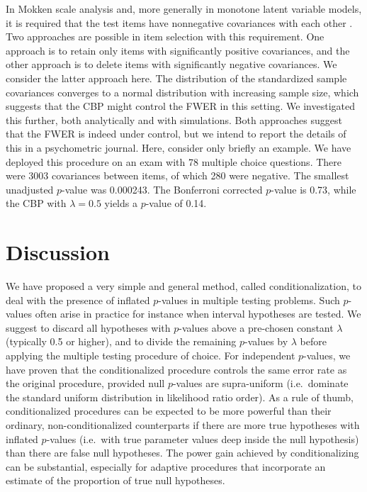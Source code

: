 \documentclass {imsart}
\begin{document}
In Mokken scale analysis and, more generally in monotone latent variable models, it is required that the test items have nonnegative covariances with each other \citep{Mokken1971,HR1986}. Two approaches are possible in item selection with this requirement. One approach is to retain only items with significantly positive covariances, and the other approach is to delete items with significantly negative covariances. We consider the latter approach here. The distribution of the standardized sample covariances converges to a normal distribution with increasing sample size, which suggests that the CBP might control the FWER in this setting. We investigated this further, both analytically and with simulations. Both approaches suggest that the FWER is indeed under control, but we intend to report the details of this in a psychometric journal. Here, consider only briefly an example. We have deployed this procedure on an exam with 78 multiple choice questions. There were 3003 covariances between items, of which 280 were negative. The smallest unadjusted $p$-value was 0.000243. The Bonferroni corrected $p$-value is 0.73, while the CBP with $\lambda=0.5$ yields a $p$-value of 0.14.




\section{Discussion}

We have proposed a very simple and general method, called conditionalization, to deal with  the presence of inflated $p$-values in multiple testing problems. Such $p$-values often arise in practice for instance when interval hypotheses are tested. We suggest to discard all hypotheses with $p$-values above a pre-chosen constant $\lambda$ (typically 0.5 or higher), and to divide the remaining $p$-values by $\lambda$ before applying the multiple testing procedure of choice. For independent $p$-values, we have proven that the conditionalized procedure controls the same error rate as the original procedure, provided null $p$-values are supra-uniform (i.e.\ dominate the standard uniform distribution in likelihood ratio order). As a rule of thumb, conditionalized procedures can be expected to be more powerful than their ordinary, non-conditionalized counterparts if there are more true hypotheses with inflated $p$-values (i.e.\ with true parameter values deep inside the null hypothesis) than there are false null hypotheses. The power gain achieved by conditionalizing can be substantial, especially for adaptive procedures that incorporate an estimate of the proportion of true null hypotheses.
 
\end{document}
